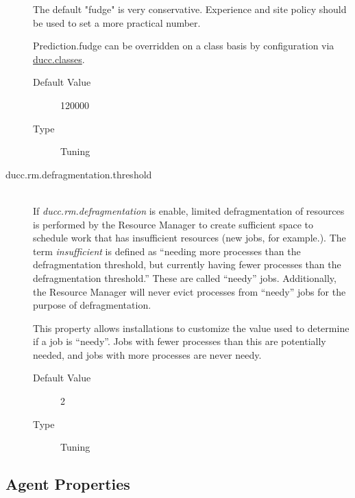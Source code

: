 \begin{description}
          The default "fudge" is very conservative. Experience and site policy should be used to set a 
          more practical number. 

          Prediction.fudge can be overridden on a class basis by configuration via 
          \hyperref[sec:ducc.classes]{ducc.classes}.

          \begin{description}
          \item[Default Value] 120000
          \item[Type] Tuning 
          \end{description}
                    

        \item[ducc.rm.defragmentation.threshold] \hfill \\
          If {\em ducc.rm.defragmentation} is enable, limited defragmentation of resources is
          performed by the Resource Manager to create sufficient space to schedule work 
          that has insufficient resources (new jobs, for example.).  The term
          {\em insufficient} is defined as ``needing more processes than the defragmentation
          threshold, but currently having fewer processes than the defragmentation
          threshold.''  These are called ``needy'' jobs.  Additionally, the Resource Manager
          will never evict processes from ``needy'' jobs for the purpose of defragmentation.

          This property allows installations to customize the value used to determine if a
          job is ``needy''.  Jobs with fewer processes than this are potentially needed, and
          jobs with more processes are never needy.
          \begin{description}
          \item[Default Value] 2
          \item[Type] Tuning 
          \end{description}
          

        \end{description}
      


\subsection{Agent Properties}

